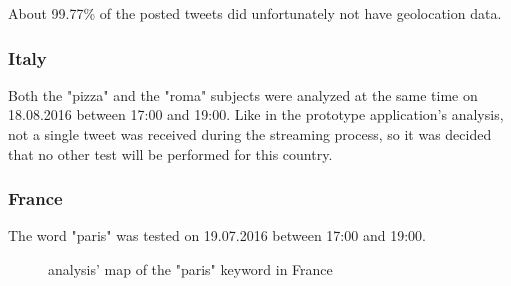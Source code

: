 \documentclass[a4paper,11pt]{report}
\begin{document}
About 99.77\% of the posted tweets did unfortunately not have geolocation data.


\subsubsection{Italy}
Both the "pizza" and the "roma" subjects were analyzed at the same time on 18.08.2016 between 17:00 and 19:00. Like in the prototype application's analysis, not a single tweet was received during the streaming process, so it was decided that no other test will be performed for this country.

\subsubsection{France}
The word "paris" was tested on 19.07.2016 between 17:00 and 19:00.
\begin{figure}[H]
\vspace{-5pt}
\begin{center}
\vspace{-20pt}
\caption{analysis' map of the "paris" keyword in France}
\end{center}
\end{figure}
\vspace{-10pt}
\end{document}

